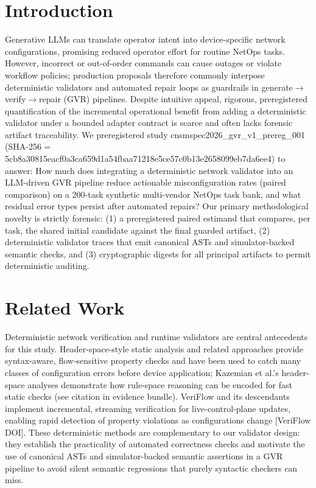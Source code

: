 \documentclass[conference]{IEEEtran}
\begin{document}
\section{Introduction}
Generative LLMs can translate operator intent into device-specific network configurations, promising reduced operator effort for routine NetOps tasks. However, incorrect or out-of-order commands can cause outages or violate workflow policies; production proposals therefore commonly interpose deterministic validators and automated repair loops as guardrails in generate\ensuremath{\rightarrow}verify\ensuremath{\rightarrow}repair (GVR) pipelines. Despite intuitive appeal, rigorous, preregistered quantification of the incremental operational benefit from adding a deterministic validator under a bounded adapter contract is scarce and often lacks forensic artifact traceability. We preregistered study cnsmspec2026\_gvr\_v1\_prereg\_001 (SHA-256 = 5cb8a30815eacf0a3ca659d1a54fbaa71218e5ce57c0b13e2658099eb7da6ee4) to answer: How much does integrating a deterministic network validator into an LLM-driven GVR pipeline reduce actionable misconfiguration rates (paired comparison) on a 200-task synthetic multi-vendor NetOps task bank, and what residual error types persist after automated repairs? Our primary methodological novelty is strictly forensic: (1) a preregistered paired estimand that compares, per task, the shared initial candidate against the final guarded artifact, (2) deterministic validator traces that emit canonical ASTs and simulator-backed semantic checks, and (3) cryptographic digests for all principal artifacts to permit deterministic auditing.

\section{Related Work}
Deterministic network verification and runtime validators are central antecedents for this study. Header-space-style static analysis and related approaches provide syntax-aware, flow‑sensitive property checks and have been used to catch many classes of configuration errors before device application; Kazemian et al.'s header-space analyses demonstrate how rule-space reasoning can be encoded for fast static checks (see citation in evidence bundle). VeriFlow and its descendants implement incremental, streaming verification for live-control-plane updates, enabling rapid detection of property violations as configurations change [VeriFlow DOI]. These deterministic methods are complementary to our validator design: they establish the practicality of automated correctness checks and motivate the use of canonical ASTs and simulator-backed semantic assertions in a GVR pipeline to avoid silent semantic regressions that purely syntactic checkers can miss.
\end{document}
